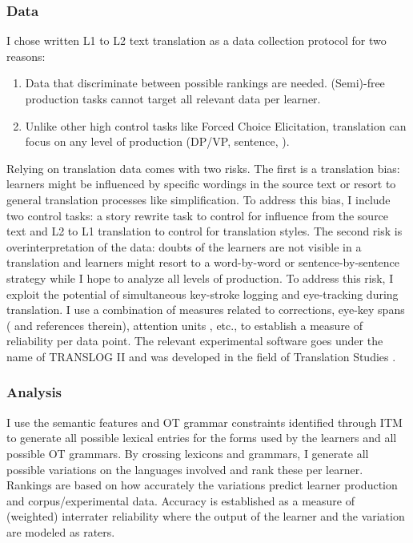 \documentclass[output=paper,
modfonts
]{langscibook}
\begin{document}
\subsubsection{Data}

I chose written L1 to L2 text translation as a data collection protocol for two reasons:

\begin{enumerate}[label=(\alph*)]
\item Data that discriminate between possible rankings are needed. (Semi)-free production tasks cannot target all relevant data per learner.
\item Unlike other high control tasks like Forced Choice Elicitation, translation can focus on any level of production (DP/VP, sentence, ).
\end{enumerate}


Relying on translation data comes with two risks. The first is a translation bias: learners might be influenced by specific wordings in the source text or resort to general translation processes like simplification. To address this bias, I include two control tasks: a story rewrite task to control for influence from the source text and L2 to L1 translation to control for translation styles. The second risk is overinterpretation of the data: doubts of the learners are not visible in a translation and learners might resort to a word-by-word or sentence-by-sentence strategy while I hope to analyze all levels of production. To address this risk, I exploit the potential of simultaneous key-stroke logging and eye-tracking during translation. I use a combination of measures related to corrections, eye-key spans (\citealt{Timarovaetal2011} and references therein), attention units \citep[e.g.][]{Hvelplund2016}, etc., to establish a measure of reliability per data point. The relevant experimental software goes under the name of TRANSLOG II and was developed in the field of Translation Studies \citep{SchwieterFerreira2017}.

\subsubsection{Analysis}

I use the semantic features and OT grammar constraints identified through ITM to generate all possible lexical entries for the forms used by the learners and all possible OT grammars. By crossing lexicons and grammars, I generate all possible variations on the languages involved and rank these per learner. Rankings are based on how accurately the variations predict learner production and corpus/experimental data. Accuracy is established as a measure of (weighted) interrater reliability where the output of the learner and the variation are modeled as raters.
\end{document}
